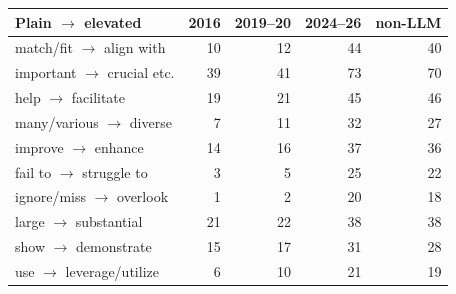 \begin{tabular}{l rrrr}
\toprule
Plain $\to$ elevated & 2016 & 2019--20 & 2024--26 & non-LLM \\
\midrule
match/fit $\to$ align with & 10 & 12 & 44 & 40 \\
important $\to$ crucial etc. & 39 & 41 & 73 & 70 \\
help $\to$ facilitate & 19 & 21 & 45 & 46 \\
many/various $\to$ diverse & 7 & 11 & 32 & 27 \\
improve $\to$ enhance & 14 & 16 & 37 & 36 \\
fail to $\to$ struggle to & 3 & 5 & 25 & 22 \\
ignore/miss $\to$ overlook & 1 & 2 & 20 & 18 \\
large $\to$ substantial & 21 & 22 & 38 & 38 \\
show $\to$ demonstrate & 15 & 17 & 31 & 28 \\
use $\to$ leverage/utilize & 6 & 10 & 21 & 19 \\
\bottomrule
\end{tabular}
